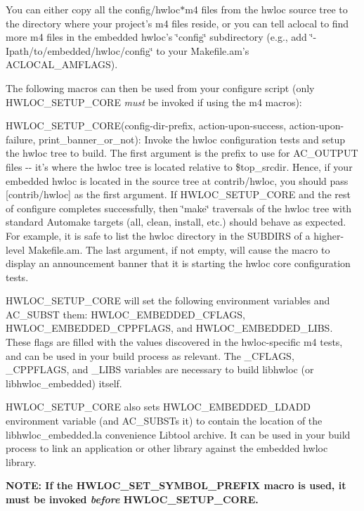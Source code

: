 You can either copy all the config/hwloc$\ast$m4 files from the hwloc source tree to the directory where your project's m4 files reside, or you can tell aclocal to find more m4 files in the embedded hwloc's \char`\"{}config\char`\"{} subdirectory (e.g., add \char`\"{}-\/Ipath/to/embedded/hwloc/config\char`\"{} to your Makefile.am's ACLOCAL\_\-AMFLAGS).

The following macros can then be used from your configure script (only HWLOC\_\-SETUP\_\-CORE {\itshape must\/} be invoked if using the m4 macros):


\begin{DoxyItemize}
\item HWLOC\_\-SETUP\_\-CORE(config-\/dir-\/prefix, action-\/upon-\/success, action-\/upon-\/failure, print\_\-banner\_\-or\_\-not): Invoke the hwloc configuration tests and setup the hwloc tree to build. The first argument is the prefix to use for AC\_\-OUTPUT files -\/-\/ it's where the hwloc tree is located relative to {\ttfamily \$top\_\-srcdir}. Hence, if your embedded hwloc is located in the source tree at contrib/hwloc, you should pass {\ttfamily \mbox{[}contrib/hwloc\mbox{]}} as the first argument. If HWLOC\_\-SETUP\_\-CORE and the rest of {\ttfamily configure} completes successfully, then \char`\"{}make\char`\"{} traversals of the hwloc tree with standard Automake targets (all, clean, install, etc.) should behave as expected. For example, it is safe to list the hwloc directory in the SUBDIRS of a higher-\/level Makefile.am. The last argument, if not empty, will cause the macro to display an announcement banner that it is starting the hwloc core configuration tests.
\end{DoxyItemize}

HWLOC\_\-SETUP\_\-CORE will set the following environment variables and AC\_\-SUBST them: HWLOC\_\-EMBEDDED\_\-CFLAGS, HWLOC\_\-EMBEDDED\_\-CPPFLAGS, and HWLOC\_\-EMBEDDED\_\-LIBS. These flags are filled with the values discovered in the hwloc-\/specific m4 tests, and can be used in your build process as relevant. The \_\-CFLAGS, \_\-CPPFLAGS, and \_\-LIBS variables are necessary to build libhwloc (or libhwloc\_\-embedded) itself.

HWLOC\_\-SETUP\_\-CORE also sets HWLOC\_\-EMBEDDED\_\-LDADD environment variable (and AC\_\-SUBSTs it) to contain the location of the libhwloc\_\-embedded.la convenience Libtool archive. It can be used in your build process to link an application or other library against the embedded hwloc library.

{\bfseries NOTE: If the HWLOC\_\-SET\_\-SYMBOL\_\-PREFIX macro is used, it must be invoked {\itshape before\/} HWLOC\_\-SETUP\_\-CORE.}


